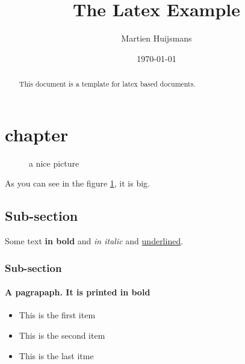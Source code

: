 \documentclass[a4paper]{article}
\author{Martien Huijsmans}
\title{The Latex Example}
\date{\today}
\begin{document}

\maketitle

\begin{abstract}
This document is a template for latex based documents.
\end{abstract}

\tableofcontents

\newpage

\section{chapter}

\begin{figure}[h!]
    \centering
    \caption{a nice picture}
    \label{fig:universe1}
\end{figure}
As you can see in the figure \ref{fig:universe1}, it is big.

\subsection{Sub-section}

Some text \textbf{in bold} and \textit{in italic} and \underline{underlined}.

\subsubsection{Sub-section}

\paragraph{A pagrapaph. It is printed in bold}
\begin{itemize}
\item This is the first item
\item This is the second item
\item This is the last itme
\end{itemize}
\end{document}
